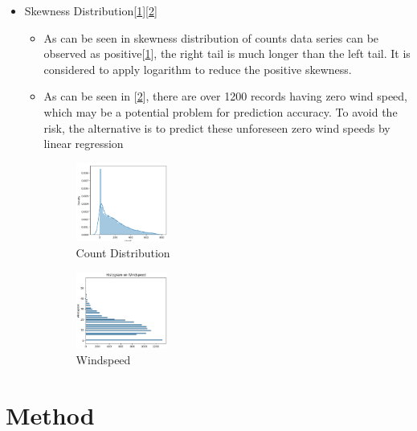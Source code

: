 \begin{itemize}
  \item Skewness Distribution[\ref{fig:CountDistribution}][\ref{fig:windspeed}]
    \begin{itemize}
        \item As can be seen in skewness distribution of counts data series can be observed as positive[\ref{fig:CountDistribution}], the right tail is much longer than the left tail. It is considered to apply logarithm to reduce the positive skewness.
        \item As can be seen in [\ref{fig:windspeed}], there are over 1200 records having zero wind speed, which may be a potential problem for prediction accuracy. To avoid the risk, the alternative is to predict these unforeseen zero wind speeds by linear regression
         \begin{figure}[!ht]
        	\centering
        	\setlength{\abovecaptionskip}{0.cm}
        	\setlength{\belowcaptionskip}{-0.cm}
        	\includegraphics[width=0.3\textwidth]{./figures/CountDistribution.png}
        	\caption{Count Distribution}
        	\label{fig:CountDistribution}
        \end{figure}
         \begin{figure}[!ht]
        	\centering
        	\setlength{\abovecaptionskip}{0.cm}
        	\setlength{\belowcaptionskip}{-0.cm}
        	\includegraphics[width=0.3\textwidth]{./figures/windspeed.png}
        	\caption{Windspeed}
        	\label{fig:windspeed}
        \end{figure}
    \end{itemize}
\end{itemize}

\section{Method} \label{sec-method}


